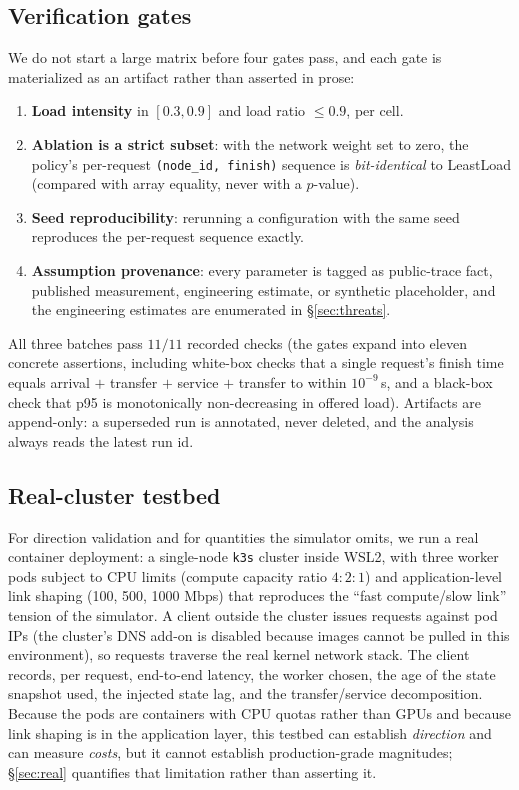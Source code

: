 \subsection{Verification gates}
\label{sec:gates}
We do not start a large matrix before four gates pass, and each gate is materialized as an
artifact rather than asserted in prose:
\begin{enumerate}
  \item \textbf{Load intensity} in $[0.3, 0.9]$ and load ratio $\le 0.9$, per cell.
  \item \textbf{Ablation is a strict subset}: with the network weight set to zero, the policy's
        per-request \texttt{(node\_id, finish)} sequence is \emph{bit-identical} to LeastLoad
        (compared with array equality, never with a $p$-value).
  \item \textbf{Seed reproducibility}: rerunning a configuration with the same seed reproduces
        the per-request sequence exactly.
  \item \textbf{Assumption provenance}: every parameter is tagged as public-trace fact, published
        measurement, engineering estimate, or synthetic placeholder, and the engineering
        estimates are enumerated in \S\ref{sec:threats}.
\end{enumerate}
All three batches pass $11/11$ recorded checks (the gates expand into eleven concrete assertions,
including white-box checks that a single request's finish time equals
arrival $+$ transfer $+$ service $+$ transfer to within $10^{-9}$\,s, and a black-box check that
p95 is monotonically non-decreasing in offered load). Artifacts are append-only: a superseded run
is annotated, never deleted, and the analysis always reads the latest run id.

\subsection{Real-cluster testbed}
\label{sec:setup:real}
For direction validation and for quantities the simulator omits, we run a real container
deployment: a single-node \texttt{k3s} cluster inside WSL2, with three worker pods subject to CPU
limits (compute capacity ratio $4{:}2{:}1$) and application-level link shaping
(100, 500, 1000 Mbps) that reproduces the
``fast compute/slow link'' tension of the simulator. A client outside the cluster issues
requests against pod IPs (the cluster's DNS add-on is disabled because images cannot be pulled in
this environment), so requests traverse the real kernel network stack. The client records, per
request, end-to-end latency, the worker chosen, the age of the state snapshot used, the injected
state lag, and the transfer/service decomposition. Because the pods are containers with CPU
quotas rather than GPUs and because link shaping is in the application layer, this testbed can
establish \emph{direction} and can measure \emph{costs}, but it cannot establish production-grade
magnitudes; \S\ref{sec:real} quantifies that limitation rather than asserting it.

